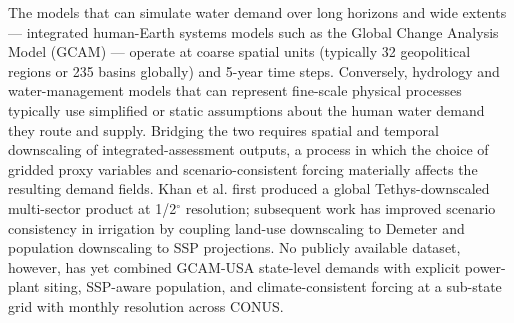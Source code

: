 \documentclass[fleqn,10pt]{wlscirep}
\begin{document}
The models that can simulate water demand over long horizons and wide extents --- integrated human-Earth systems models such as the Global Change Analysis Model (GCAM)\cite{Zhao_gcamusa_water, Calvin2019GCAM, Binsted_2022} --- operate at coarse spatial units (typically 32 geopolitical regions or 235 basins globally) and 5-year time steps. Conversely, hydrology and water-management models that can represent fine-scale physical processes typically use simplified or static assumptions about the human water demand they route and supply\cite{Abeshu_2023, Wada_2017}. Bridging the two requires spatial and temporal downscaling of integrated-assessment outputs\cite{hess-17-4555-2013, van_Vliet_2021, Jones_2024}, a process in which the choice of gridded proxy variables and scenario-consistent forcing materially affects the resulting demand fields. Khan et al.\cite{Khan2023} first produced a global Tethys-downscaled multi-sector product at 1/2$^{\circ}$ resolution; subsequent work has improved scenario consistency in irrigation by coupling land-use downscaling to Demeter\cite{Vernon-2018, BIJL201675} and population downscaling to SSP projections\cite{Jones_2016}. 
No publicly available dataset, however, has yet combined GCAM-USA state-level demands with explicit power-plant siting, SSP-aware population, and climate-consistent forcing at a sub-state grid with monthly resolution across CONUS.
\end{document}
